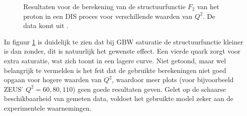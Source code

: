 \documentclass[a4paper,11pt]{article}
\numberwithin{equation}{section} %
\begin{document}
\begin{figure} [H]
\centering
{}
\caption{Resultaten voor de berekening van de structuurfunctie $F_2$ van het proton in een DIS proces voor verschillende waarden van $Q^2$. De data komt uit \cite{ZEUS}.}
\label{fig:ResFL}
\end{figure}
In figuur \ref{fig:ResFL} is duidelijk te zien dat bij GBW saturatie de structuurfunctie kleiner is dan zonder, dit is natuurlijk het gewenste effect.
Een vierde quark zorgt voor extra saturatie, wat zich toont in een lagere curve.
Niet getoond, maar wel belangrijk te vermelden is het feit dat de gebruikte berekeningen niet goed opgaan voor hogere waarden van $Q^2$, waardoor meer plots (voor bijvoorbeeld ZEUS’ $Q^2=60, 80, 110$) geen goede resultaten geven.
Gelet op de schaarse beschikbaarheid van gemeten data, voldoet het gebruikte model zeker aan de experimentele waarnemingen.
\end{document}
